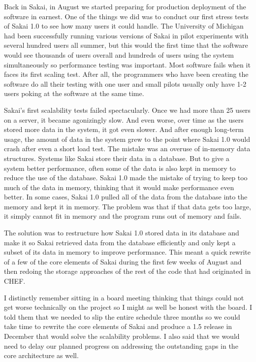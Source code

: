 \documentclass[12pt]{book}
\begin{document}
Back in Sakai, in August we started preparing for production deployment
of the software in earnest.  One of the things
we did was to conduct our first stress tests
of Sakai 1.0 to see how many users it could handle.
The University of Michigan had been successfully running various
versions of Sakai in pilot experiments with several
hundred users all summer, but this would
the first time that the software would see
thousands of users overall and hundreds of users
using the system simultaneously so performance testing
was important.
Most software fails when it faces its first scaling
test.  After all, the programmers who have been creating
the software do all their testing with one user
and small pilots usually only have 1-2 users poking
at the software at the same time.

Sakai's first scalability tests failed spectacularly.
Once we had more than 25 users on a server, it became
agonizingly slow.  And even worse, over time
as the users stored more data in the system, it got
even slower.  And after enough long-term usage, the
amount of data in the system grew to the point where
Sakai 1.0 would crash after even a short load test.
The mistake was an overuse of in-memory data
structures.  Systems like Sakai store their data
in a database.  But to give a system better
performance, often some of the data is also kept
in memory to reduce the use of the database.
Sakai 1.0 made the mistake of trying to keep
too much of the data in memory, thinking that
it would make performance even better.
In some cases, Sakai 1.0 pulled all of the
data from the database into the memory
and kept it in memory.  The problem was that if
that data gets too large, it simply cannot fit
in memory and the program runs out of memory
and fails.

The solution was to restructure how Sakai 1.0
stored data in its database and make it so
Sakai retrieved data from the database efficiently
and only kept a subset of its data in memory
to improve performance.  This meant a quick
rewrite of a few of the core elements of Sakai
during the first few weeks of August and then
redoing the storage approaches of the rest of
the code that had originated in CHEF.

I distinctly remember sitting in a board meeting
thinking that things could not get worse
technically on the project so I might as well
be honest with the board.  I told them that
we needed to slip the entire schedule three
months so we could take time to
rewrite the core elements of Sakai and produce
a 1.5 release in December that would solve
the scalability problems.  I also said
that we would need to delay our planned progress
on addressing the outstanding gaps in the
core architecture as well.
\end{document}
